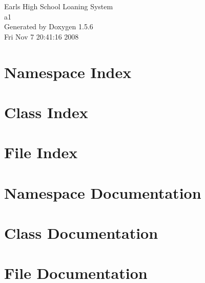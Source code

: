 \documentclass[a4paper]{book}
\begin{document}
\begin{titlepage}
\vspace*{7cm}
\begin{center}
{\Large Earls High School Loaning System \\[1ex]\large a1 }\\
\vspace*{1cm}
{\large Generated by Doxygen 1.5.6}\\
\vspace*{0.5cm}
{\small Fri Nov 7 20:41:16 2008}\\
\end{center}
\end{titlepage}
\clearemptydoublepage
{}
\tableofcontents
\clearemptydoublepage
{}
\chapter{Namespace Index}

\chapter{Class Index}

\chapter{File Index}

\chapter{Namespace Documentation}













\chapter{Class Documentation}






\chapter{File Documentation}













\printindex
\end{document}

